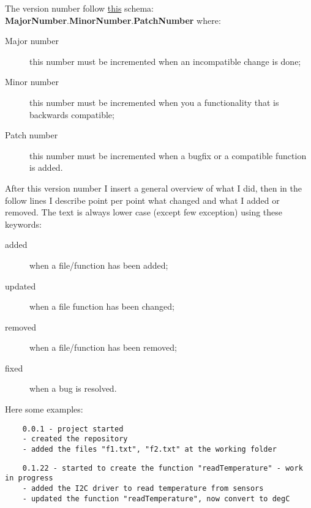 The version number follow \href{https://semver.org/}{this} schema: \textbf{MajorNumber}.\textbf{MinorNumber}.\textbf{PatchNumber} where:

\begin{description}

    \item [Major number] this number must be incremented when an incompatible change is done;
    
    \item [Minor number] this number must be incremented when you a functionality that is backwards compatible;
    
    \item [Patch number] this number must be incremented when a bugfix or a compatible function is added.
    
\end{description}


After this version number I insert a general overview of what I did, then in the follow lines I describe point per point what changed and what I added or removed. The text is always lower case (except few exception) using these keywords:


\begin{description}

    \item [added] when a file/function has been added;
    
    \item [updated] when a file function has been changed;
    
    \item [removed] when a file/function has been removed;
    
    \item [fixed] when a bug is resolved.

\end{description}


Here some examples:

\begin{verbatim}
    0.0.1 - project started
    - created the repository
    - added the files "f1.txt", "f2.txt" at the working folder
\end{verbatim}

\begin{verbatim}
    0.1.22 - started to create the function "readTemperature" - work in progress
    - added the I2C driver to read temperature from sensors
    - updated the function "readTemperature", now convert to degC
\end{verbatim}

